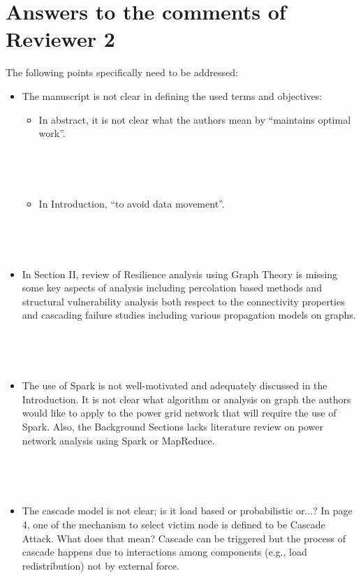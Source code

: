 \section{Answers to the comments of Reviewer 2}
%
%


The following points specifically need to be addressed:

\begin{itemize}
\item The manuscript is not clear in defining the used terms and objectives:
\begin{itemize}
\item In abstract, it is not clear what the authors mean by ``maintains optimal work''.

~


~

\item In Introduction, ``to avoid data movement''. 

~


~
\end{itemize}

\item In Section II, review of Resilience analysis using Graph Theory is missing some key aspects of analysis including percolation based methods and structural vulnerability analysis both respect to the connectivity properties and cascading failure studies including various propagation models on graphs.

~



~


\item The use of Spark is not well-motivated and adequately discussed in the Introduction. It is not clear what algorithm or analysis on graph the authors would like to apply to the power grid network that will require the use of Spark. 
Also, the Background Sections lacks literature review on power network analysis using Spark or MapReduce.

~


~

\item The cascade model is not clear; is it load based or probabilistic or...? In page 4, one of the mechanism to select victim node is defined to be Cascade Attack. What does that mean? Cascade can be triggered but the process of cascade happens due to interactions among components (e.g., load redistribution) not by external force.


\end{itemize}
